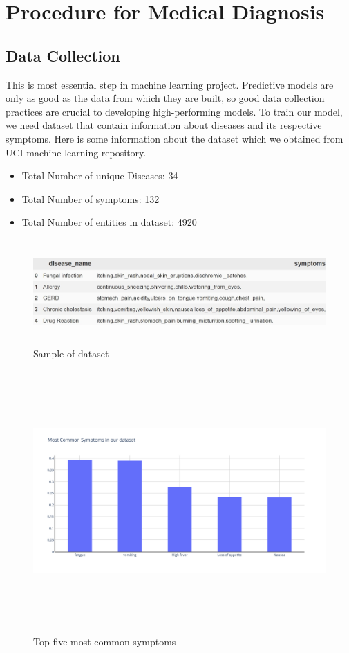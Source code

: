 \section{Procedure for Medical Diagnosis}
\subsection{Data Collection}
This is most essential step in machine learning project. Predictive models are only as good as the data from which they are built, so good data collection practices are crucial to developing high-performing models. To train our model, we need dataset that contain information about diseases and its respective symptoms.\newline
Here is some information about the dataset which we obtained from UCI machine learning repository.
\begin{itemize}
    \item Total Number of unique Diseases: 34
    \item Total Number of symptoms: 132
    \item Total Number of entities in dataset: 4920
     
\end{itemize}

\begin{figure}[h]
\includegraphics[width=160mm,height=40mm]{dataset_summary/diseaseAndSymptoms.jpg}
 \caption{Sample of dataset}
\end{figure}

\begin{figure}[H]
 \includegraphics[width=170mm,height=100mm]{dataset_summary/top5Disease.jpg}
 \caption{Top five most common symptoms}
\end{figure}

